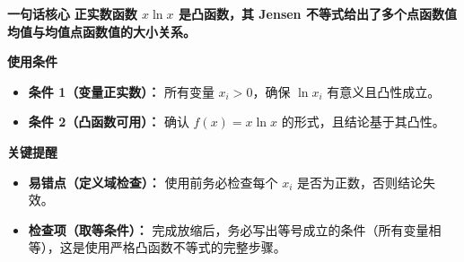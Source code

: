 \begin{summarybox}
\textbf{\textcolor{CSummary}{一句话核心}}
\textbf{正实数函数 $x\ln x$ 是凸函数，其 Jensen 不等式给出了多个点函数值均值与均值点函数值的大小关系。}

\medskip
\textbf{\textcolor{CSummary}{使用条件}}
\begin{itemize}[leftmargin=*, itemsep=0.5em, topsep=0.4em]
    \item \textbf{条件 1（变量正实数）：} 所有变量 $x_i > 0$，确保 $\ln x_i$ 有意义且凸性成立。
    \item \textbf{条件 2（凸函数可用）：} 确认 $f(x)=x\ln x$ 的形式，且结论基于其凸性。
\end{itemize}

\medskip
\textbf{\textcolor{CSummary}{关键提醒}}
\begin{itemize}[leftmargin=*, itemsep=0.5em, topsep=0.4em]
    \item \textbf{易错点（定义域检查）：} 使用前务必检查每个 $x_i$ 是否为正数，否则结论失效。
    \item \textbf{检查项（取等条件）：} 完成放缩后，务必写出等号成立的条件（所有变量相等），这是使用严格凸函数不等式的完整步骤。
\end{itemize}
\end{summarybox}
